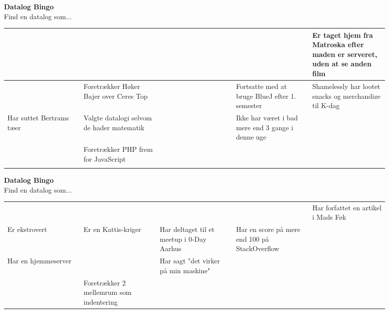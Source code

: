 \documentclass{article}
\begin{document}
\begin{center}
{\LARGE\bfseries Datalog Bingo}\\[0.5em]
{\large Find en datalog som...}\\[2em]
\begin{tabular}{|p{0.18\linewidth}|p{0.18\linewidth}|p{0.18\linewidth}|p{0.18\linewidth}|p{0.18\linewidth}|}
\hline
  &   &   &   & Er taget hjem fra Matroska efter maden er serveret, uden at se anden film \\
\hline
  & Foretrækker Høker Bajer over Ceres Top &   & Fortsatte med at bruge BlueJ efter 1. semester & Shamelessly har lootet snacks og merchandize til K-dag \\
\hline
Har suttet Bertrams tæer & Valgte datalogi selvom de hader matematik &   & Ikke har været i bad mere end 3 gange i denne uge &   \\
\hline
  & Foretrækker PHP frem for JavaScript &   &   &   \\
\hline
  &   &   &   &   \\
\hline
\end{tabular}
\end{center}
\newpage

\begin{center}
{\LARGE\bfseries Datalog Bingo}\\[0.5em]
{\large Find en datalog som...}\\[2em]
\begin{tabular}{|p{0.18\linewidth}|p{0.18\linewidth}|p{0.18\linewidth}|p{0.18\linewidth}|p{0.18\linewidth}|}
\hline
  &   &   &   &   \\
\hline
  &   &   &   & Har forfattet en artikel i Mads Føk \\
\hline
Er ekstrovert & Er en Kattis-kriger & Har deltaget til et meetup i  0-Day Aarhus & Har en score på mere end 100 på StackOverflow &   \\
\hline
Har en hjemmeserver &   & Har sagt "det virker på min maskine" &   &   \\
\hline
  & Foretrækker 2 mellemrum som indentering &   &   &   \\
\hline
\end{tabular}
\end{center}
\newpage
\end{document}
